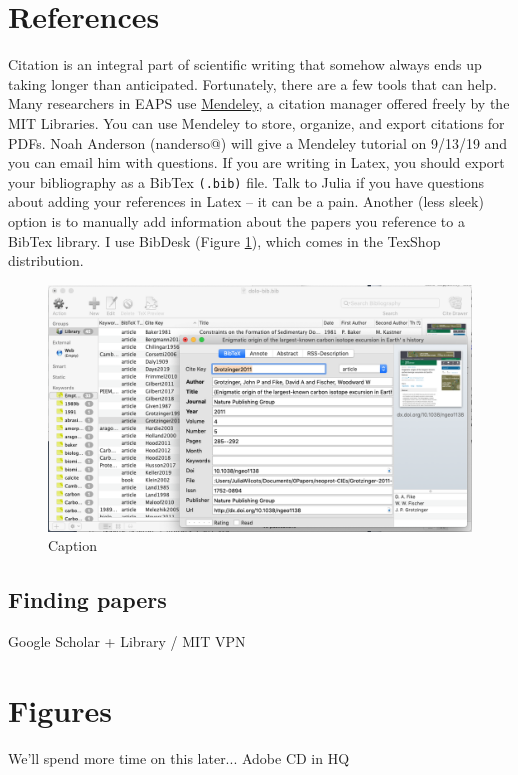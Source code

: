 \documentclass{article}
\begin{document}
\section*{References}
Citation is an integral part of scientific writing that somehow always ends up taking longer than anticipated. Fortunately, there are a few tools that can help. Many researchers in EAPS use \href{https://libguides.mit.edu/cite-write/mendeley#s-lg-box-wrapper-18620527}{Mendeley}, a citation manager offered freely by the MIT Libraries. You can use Mendeley to store, organize, and export citations for PDFs. Noah Anderson (nanderso@) will give a Mendeley tutorial on 9/13/19 and you can email him with questions. If you are writing in Latex, you should export your bibliography as a BibTex \texttt{(.bib)} file. Talk to Julia if you have questions about adding your references in Latex -- it can be a pain. Another (less sleek) option is to manually add information about the papers you reference to a BibTex library. I use BibDesk  (Figure \ref{fig:bib}), which comes in the TexShop distribution. 

\begin{figure}[h!]
    \centering
    \includegraphics{bibdesk}
    \caption{Caption}
    \label{fig:bib}
\end{figure}


\subsection*{Finding papers}
Google Scholar + Library / MIT VPN

\section*{Figures}
We'll spend more time on this later... Adobe CD in HQ
\end{document}

